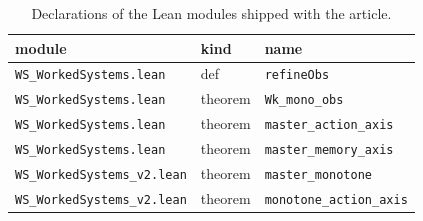\begin{table}[H]
\centering\small
\caption{Declarations of the Lean modules shipped with the article.}
\label{tab:lean}
\begin{tabular}{lll}
\toprule
module & kind & name \\
\midrule
\texttt{WS\_WorkedSystems.lean} & def & \texttt{refineObs} \\
\texttt{WS\_WorkedSystems.lean} & theorem & \texttt{Wk\_mono\_obs} \\
\texttt{WS\_WorkedSystems.lean} & theorem & \texttt{master\_action\_axis} \\
\texttt{WS\_WorkedSystems.lean} & theorem & \texttt{master\_memory\_axis} \\
\texttt{WS\_WorkedSystems\_v2.lean} & theorem & \texttt{master\_monotone} \\
\texttt{WS\_WorkedSystems\_v2.lean} & theorem & \texttt{monotone\_action\_axis} \\
\bottomrule
\end{tabular}
\end{table}
